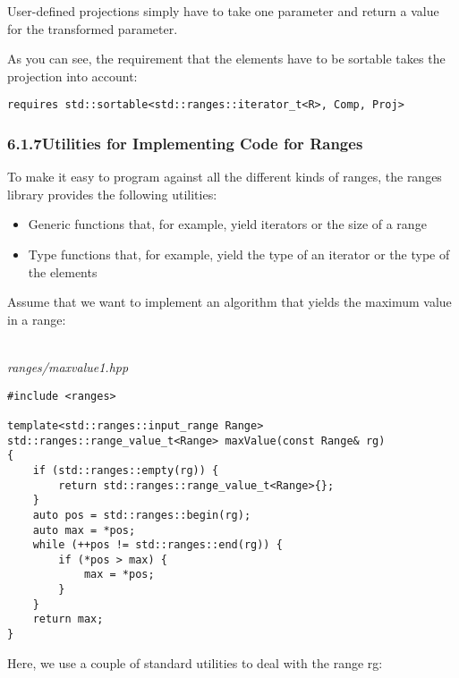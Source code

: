 User-defined projections simply have to take one parameter and return a value for the transformed parameter.

As you can see, the requirement that the elements have to be sortable takes the projection into account:

\begin{lstlisting}[style=styleCXX]
requires std::sortable<std::ranges::iterator_t<R>, Comp, Proj>
\end{lstlisting}


\subsubsection*{ 6.1.7\hspace{0.2cm}Utilities for Implementing Code for Ranges}

To make it easy to program against all the different kinds of ranges, the ranges library provides the following utilities:

\begin{itemize}
\item
Generic functions that, for example, yield iterators or the size of a range

\item
Type functions that, for example, yield the type of an iterator or the type of the elements
\end{itemize}

Assume that we want to implement an algorithm that yields the maximum value in a range:

\noindent
\hspace*{\fill} \\ %
\textit{ranges/maxvalue1.hpp}

\begin{lstlisting}[style=styleCXX]
#include <ranges>

template<std::ranges::input_range Range>
std::ranges::range_value_t<Range> maxValue(const Range& rg)
{
	if (std::ranges::empty(rg)) {
		return std::ranges::range_value_t<Range>{};
	}
	auto pos = std::ranges::begin(rg);
	auto max = *pos;
	while (++pos != std::ranges::end(rg)) {
		if (*pos > max) {
			max = *pos;
		}
	}
	return max;
}
\end{lstlisting}

Here, we use a couple of standard utilities to deal with the range rg:

